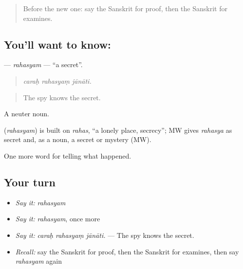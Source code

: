 \label{lesson:SA-C292-rahasyam}



\begin{quote}
Before the new one: say the Sanskrit for proof, then the Sanskrit for examines.
\end{quote}

\subsection*{You'll want to know: }
\textbf{} — \emph{rahasyam} — \textquotedblleft{}a secret\textquotedblright{}.

\begin{quote}
  
\end{quote}

\begin{quote}
\emph{caraḥ rahasyaṃ jānāti.}
\end{quote}

\begin{quote}
The spy knows the secret.
\end{quote}

A neuter noun.

\begin{cousinweb}
\textbf{} (\emph{rahasyam}) is built on \emph{rahas}, \textquotedblleft{}a lonely place, secrecy\textquotedblright{}; MW gives \emph{rahasya} as secret and, as a noun, a secret or mystery (MW).
\end{cousinweb}

\begin{grammarlens}[title={What you've built}]
One more word for telling what happened.
\end{grammarlens}

\subsection*{Your turn}
\begin{itemize}
\raggedright
  \item \emph{Say it:} \emph{rahasyam}
  \item \emph{Say it:} \emph{rahasyam}, once more
  \item \emph{Say it:} \emph{caraḥ rahasyaṃ jānāti.} — The spy knows the secret.
  \item \emph{Recall:} say the Sanskrit for proof, then the Sanskrit for examines, then say \emph{rahasyam} again
\end{itemize}

